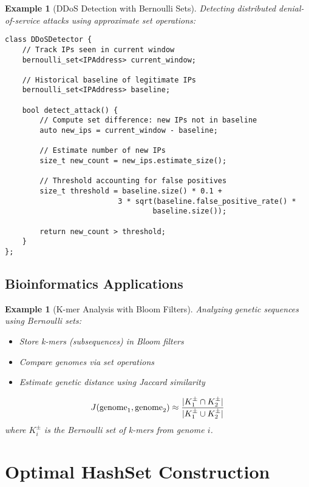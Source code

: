 \documentclass[11pt,final,hidelinks]{article}
\newtheorem{example}[theorem]{Example}
\newcommand{\setpm}[1]{#1^{\pm}} %
\newcommand{\ASet}[1]{\setpm{#1}}  %
\begin{document}
\begin{example}[DDoS Detection with Bernoulli Sets]
Detecting distributed denial-of-service attacks using approximate set operations:

\begin{verbatim}
class DDoSDetector {
    // Track IPs seen in current window
    bernoulli_set<IPAddress> current_window;
    
    // Historical baseline of legitimate IPs
    bernoulli_set<IPAddress> baseline;
    
    bool detect_attack() {
        // Compute set difference: new IPs not in baseline
        auto new_ips = current_window - baseline;
        
        // Estimate number of new IPs
        size_t new_count = new_ips.estimate_size();
        
        // Threshold accounting for false positives
        size_t threshold = baseline.size() * 0.1 + 
                          3 * sqrt(baseline.false_positive_rate() * 
                                  baseline.size());
        
        return new_count > threshold;
    }
};
\end{verbatim}
\end{example}

\subsection{Bioinformatics Applications}

\begin{example}[K-mer Analysis with Bloom Filters]
Analyzing genetic sequences using Bernoulli sets:
\begin{itemize}
    \item Store k-mers (subsequences) in Bloom filters
    \item Compare genomes via set operations
    \item Estimate genetic distance using Jaccard similarity
\end{itemize}

\begin{equation}
J(\text{genome}_1, \text{genome}_2) \approx \frac{\Card{\ASet{K}_1 \cap \ASet{K}_2}}{\Card{\ASet{K}_1 \cup \ASet{K}_2}}
\end{equation}
where $\ASet{K}_i$ is the Bernoulli set of k-mers from genome $i$.
\end{example}

\section{Optimal HashSet Construction}
\end{document}
